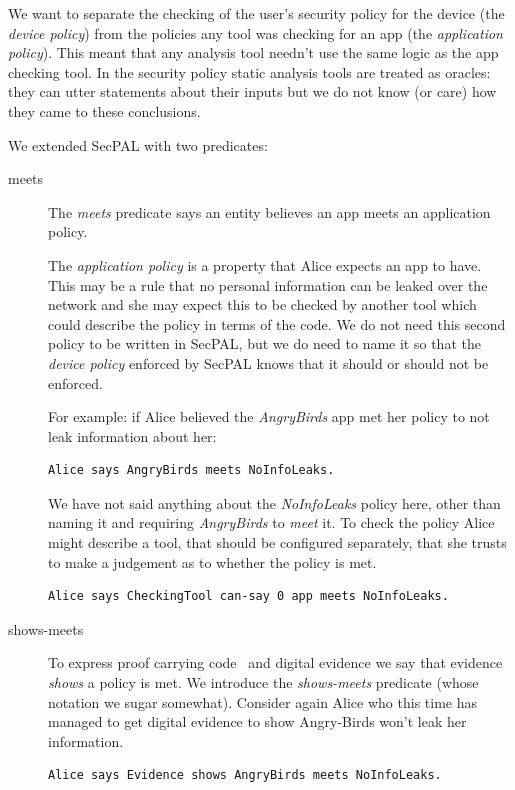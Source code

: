 \documentclass[a4paper]{article}
\begin{document}
We want to separate the checking of the user's security policy for the device
(the \emph{device policy}) from the policies any tool was checking for an app
(the \emph{application policy}).  This meant that any analysis tool needn't use
the same logic as the app checking tool.  In the security policy static analysis
tools are treated as oracles: they can utter statements about their inputs but
we do not know (or care) how they came to these conclusions.

We extended SecPAL with two predicates:  

\begin{description}
  \item[\ttfamily meets] 
The \emph{meets} predicate says an
entity believes an app meets an application policy. 

The \emph{application policy} is a property that Alice expects an app to have.
This may be a rule that no personal information can be leaked over the network
and she may expect this to be checked by another tool which could describe the
policy in terms of the code.  We do not need this second policy to be written in
SecPAL, but we do need to name it so that the \emph{device policy} enforced by
SecPAL knows that it should or should not be enforced.

For example: if Alice believed the \emph{AngryBirds} app met her policy to not
leak information about her:

\begin{lstlisting}[language=SecPAL]
Alice says AngryBirds meets NoInfoLeaks.
\end{lstlisting}

We have not said anything about the \emph{NoInfoLeaks} policy here, other than
naming it and requiring \emph{AngryBirds} to \emph{meet} it.  To check the
policy Alice might describe a tool, that should be configured separately, that
she trusts to make a judgement as to whether the policy is met.

\begin{lstlisting}[language=SecPAL]
Alice says CheckingTool can-say 0 app meets NoInfoLeaks.
\end{lstlisting}

\item[\ttfamily shows-meets]
To express proof carrying code~\cite{Necula:1996tr} and digital
evidence we say that evidence \emph{shows} a policy is met.  
We introduce the \emph{shows-meets} predicate (whose notation we sugar
somewhat).  Consider again Alice who this time has managed to get
digital evidence to show Angry-Birds won't leak her information.

\begin{lstlisting}[language=SecPAL]
Alice says Evidence shows AngryBirds meets NoInfoLeaks.
\end{lstlisting}
\end{description}
\end{document}

